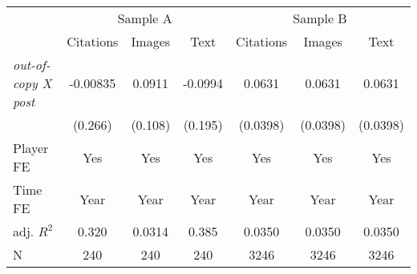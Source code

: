 {
\def\sym#1{\ifmmode^{#1}\else\(^{#1}\)\fi}
\begin{tabular*}{\hsize}{@{\hskip\tabcolsep\extracolsep\fill}l*{6}{c}}
\toprule
            &\multicolumn{3}{c}{Sample A}                                     &\multicolumn{3}{c}{Sample B}                                     \\\cmidrule(lr){2-4}\cmidrule(lr){5-7}
            &\multicolumn{1}{c}{Citations}&\multicolumn{1}{c}{Images}&\multicolumn{1}{c}{Text}&\multicolumn{1}{c}{Citations}&\multicolumn{1}{c}{Images}&\multicolumn{1}{c}{Text}\\
\midrule
\emph{out-of-copy X post}&    -0.00835         &      0.0911         &     -0.0994         &      0.0631         &      0.0631         &      0.0631         \\
            &     (0.266)         &     (0.108)         &     (0.195)         &    (0.0398)         &    (0.0398)         &    (0.0398)         \\
\midrule
Player FE   &         Yes         &         Yes         &         Yes         &         Yes         &         Yes         &         Yes         \\
Time FE     &        Year         &        Year         &        Year         &        Year         &        Year         &        Year         \\
adj. $R^2$  &       0.320         &      0.0314         &       0.385         &      0.0350         &      0.0350         &      0.0350         \\
N           &         240         &         240         &         240         &        3246         &        3246         &        3246         \\
\bottomrule
\end{tabular*}
}
